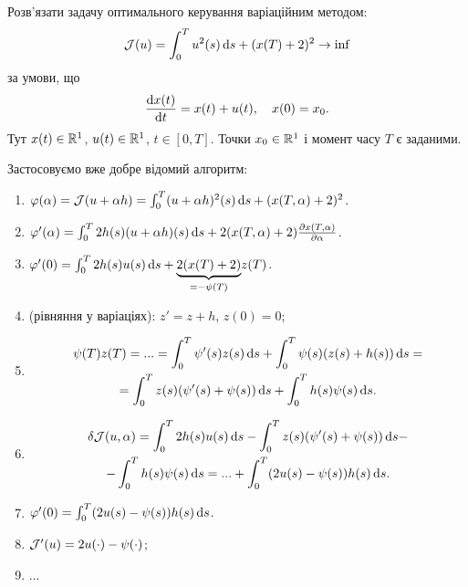 \begin{problem}
	Розв'язати задачу оптимального керування варіаційним методом: \[ \mathcal{J}(u) = \int_0^T u^2(s) \mathop{}\!\mathrm{d} s + (x(T) + 2)^2 \to \inf\] за умови, що \[ \frac{\mathop{}\!\mathrm{d} x(t)}{\mathop{}\!\mathrm{d} t} = x(t) + u(t), \quad x(0) = x_0.\] Тут $x(t) \in \mathbb{R}^1$, $u(t)\in\mathbb{R}^1$, $t\in[0,T]$. Точки $x_0\in\mathbb{R}^1$ і момент часу $T$ є заданими.
\end{problem}

\begin{solution}
	Застосовуємо вже добре відомий алгоритм:
	\begin{enumerate}
		\item $\varphi(\alpha) = \mathcal{J}(u + \alpha h) = \int_0^T (u + \alpha h)^2(s) \mathop{}\!\mathrm{d} s + (x(T, \alpha) + 2)^2$.
		\item $\varphi'(\alpha) = \int_0^T 2 h (s) (u + \alpha h)(s) \mathop{}\!\mathrm{d} s + 2 (x(T, \alpha) + 2) \frac{\partial x(T, \alpha)}{\partial \alpha}$.
		\item $\varphi'(0) = \int_0^T 2 h (s) u(s) \mathop{}\!\mathrm{d} s + \underset{=-\psi(T)}{\underbrace{2 (x(T) + 2)}} z(T)$.
		\item (рівняння у варіаціях): $z' = z + h$, $z(0) = 0$;
		\item \begin{multline*}
			\psi(T) z (T) = ... = \int_0^T \psi' (s) z(s) \mathop{}\!\mathrm{d} s + \int_0^T \psi(s) (z(s) + h(s)) \mathop{}\!\mathrm{d} s = \\
			= \int_0^T z(s) (\psi'(s) + \psi(s)) \mathop{}\!\mathrm{d} s + \int_0^T h(s) \psi(s) \mathop{}\!\mathrm{d} s.
		\end{multline*}
		\item \begin{multline*}
			\delta \mathcal{J}(u, \alpha) = \int_0^T 2 h(s) u(s) \mathop{}\!\mathrm{d} s - \int_0^T z(s) (\psi'(s) + \psi(s)) \mathop{}\!\mathrm{d} s - \\
			- \int_0^T h(s) \psi(s) \mathop{}\!\mathrm{d} s = ... + \int_0^T (2u(s)-\psi(s)) h(s) \mathop{}\!\mathrm{d} s.
		\end{multline*}
		\item $\varphi'(0) = \int_0^T (2u(s)-\psi(s)) h(s) \mathop{}\!\mathrm{d} s$.
		\item $\mathcal{J}'(u) = 2 u (\cdot) - \psi(\cdot)$;
		\item ...
	\end{enumerate}
\end{solution}

\begin{problem}
\end{problem}

\begin{solution}
\end{solution}